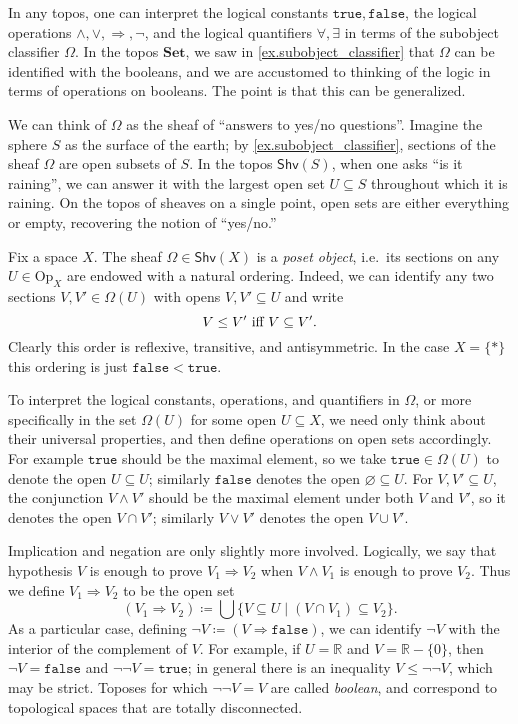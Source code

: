 \documentclass[11pt, oneside, article]{memoir}
\theoremstyle{plain}
\theoremstyle{definition}
\theoremstyle{remark}
\renewcommand{\ss}{\subseteq}
\newcommand{\const}[1]{\mathtt{#1}}
\newcommand{\Set}[1]{\mathrm{#1}}
\newcommand{\Cat}[1]{\mathbf{#1}}
\newcommand{\Fun}[1]{\mathsf{#1}}
\newcommand{\smset}{\Cat{Set}}
\newcommand{\tn}[1]{\textnormal{#1}}
\newcommand{\rr}{\mathbb{R}}
\newcommand{\shv}{\Fun{Shv}}
\newcommand{\Op}{\Set{Op}}
\newcommand{\imp}{\Rightarrow}
\newcommand{\true}{\const{true}}
\newcommand{\false}{\const{false}}
\begin{document}
In any topos, one can interpret the logical constants $\true,\false$, the logical operations $\wedge,\vee,\imp,\neg$, and the logical quantifiers $\forall,\exists$ in terms of the subobject classifier $\Omega$. In the topos $\smset$, we saw in \cref{ex.subobject_classifier} that $\Omega$ can be identified with the booleans, and we are accustomed to thinking of the logic in terms of operations on booleans. The point is that this can be generalized.

We can think of $\Omega$ as the sheaf of ``answers to yes/no questions''. Imagine the sphere $S$ as the surface of the earth; by \cref{ex.subobject_classifier}, sections of the sheaf $\Omega$ are open subsets of $S$. In the topos $\shv(S)$, when one asks ``is it raining'', we can answer it with the largest open set $U\ss S$ throughout which it is raining. On the topos of sheaves on a single point, open sets are either everything or empty, recovering the notion of ``yes/no.''

Fix a space $X$. The sheaf $\Omega\in\shv(X)$ is a \emph{poset object}, i.e.\ its sections on any $U\in\Op_X$ are endowed with a natural ordering. Indeed, we can identify any two sections $V,V'\in\Omega(U)$ with opens $V,V'\ss U$ and write
\begin{equation}\label{eqn.prop_order}
V\leq V'\tn{ iff }V\ss V'.
\end{equation} 
Clearly this order is reflexive, transitive, and antisymmetric. In the case $X=\{*\}$ this ordering is just $\false<\true$.

To interpret the logical constants, operations, and quantifiers in $\Omega$, or more specifically in the set $\Omega(U)$ for some open $U\ss X$, we need only think about their universal properties, and then define operations on open sets accordingly. For example $\true$ should be the maximal element, so we take $\true\in\Omega(U)$ to denote the open $U\ss U$; similarly $\false$ denotes the open $\varnothing\ss U$. For $V,V'\ss U$, the conjunction $V\wedge V'$ should be the maximal element under both $V$ and $V'$, so it denotes the open $V\cap V'$; similarly $V\vee V'$ denotes the open $V\cup V'$.

Implication and negation are only slightly more involved. Logically, we say that hypothesis $V$ is enough to prove $V_1\imp V_2$ when $V\wedge V_1$ is enough to prove $V_2$. Thus we define $V_1\imp V_2$ to be the open set
\begin{equation}\label{eqn.implication}
	(V_1\imp V_2)\coloneqq\bigcup\{V\ss U\mid (V\cap V_1)\ss V_2\}.
\end{equation}
 As a particular case, defining $\neg V\coloneqq (V\imp \false)$, we can identify $\neg V$ with the interior of the complement of $V$. For example, if $U=\rr$ and $V=\rr-\{0\}$, then $\neg V=\false$ and $\neg\neg V=\true$; in general there is an inequality $V\leq\neg\neg V$, which may be strict. Toposes for which $\neg\neg V=V$ are called \emph{boolean}, and correspond to topological spaces that are totally disconnected.
\end{document}
